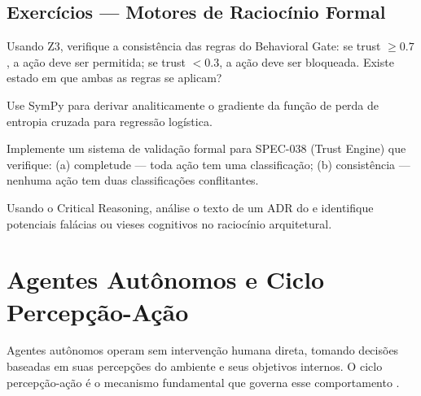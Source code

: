 \subsection{Exercícios — Motores de Raciocínio Formal}
\begin{exercicio}
Usando Z3, verifique a consistência das regras do Behavioral Gate:
se trust $\geq 0.7$, a ação deve ser permitida; se trust $< 0.3$, a
ação deve ser bloqueada. Existe estado em que ambas as regras se aplicam?
\end{exercicio}
\begin{exercicio}
Use SymPy para derivar analiticamente o gradiente da função de perda
de entropia cruzada para regressão logística.
\end{exercicio}
\begin{exercicio}
Implemente um sistema de validação formal para SPEC-038 (Trust Engine) que
verifique: (a) completude --- toda ação tem uma classificação; (b)
consistência --- nenhuma ação tem duas classificações conflitantes.
\end{exercicio}
\begin{exercicio}
Usando o Critical Reasoning, análise o texto de um ADR do \opencodeeco{}
e identifique potenciais falácias ou vieses cognitivos no raciocínio
arquitetural.
\end{exercicio}
\section{Agentes Autônomos e Ciclo Percepção-Ação}
\label{sec:agentes-autonomos}
\nivelphd
Agentes autônomos operam sem intervenção humana direta, tomando decisões
baseadas em suas percepções do ambiente e seus objetivos internos. O ciclo
percepção-ação é o mecanismo fundamental que governa esse comportamento
\cite{russell2020inteligencia}.
